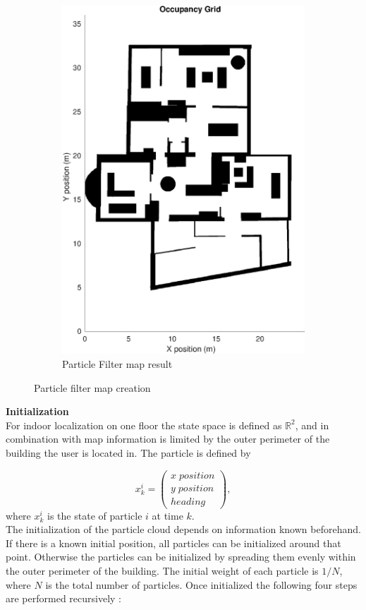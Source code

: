 \begin{figure}[H]
\begin{subfigure}[t]{.3\textwidth}
		\includegraphics[width=0.9\linewidth]{images/20201030_1157_pf_map_1}
		\caption{Particle Filter map result}
		\label{fig:pf_map}
	\end{subfigure}
	\label{fig:particle_map_construction}
	\caption{Particle filter map creation}
\end{figure}

\textbf{Initialization}\\
For indoor localization on one floor the state space is defined as $\mathbb{R}^{2}$, and in combination with map information is limited by the outer perimeter of the building the user is located in. The particle is defined by 

\begin{equation}
x_k^i = \left(\begin{array}{l}
x \; position \\
y \; position\\
heading
\end{array}\right), 
\label{eq:pf_state}
\end{equation}
where $x^i_k$ is the state of particle $i$ at time $k$.\\
The initialization of the particle cloud depends on information known beforehand. If there is a known initial position, all particles can be initialized around that point. Otherwise the particles can be initialized by spreading them evenly within the outer perimeter of the building. The initial weight of each particle is $1/N$, where $N$ is the total number of particles. Once initialized the following four steps are performed recursively \cite{Wu2019,Woodman2008}: 

